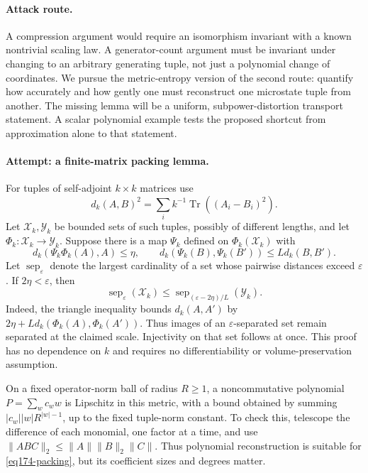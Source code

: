 \documentclass[11pt,a4paper]{article}
\newcommand{\eps}{\varepsilon}
\numberwithin{equation}{section}
\begin{document}
\paragraph{Attack route.}
A compression argument would require an isomorphism invariant with a known
nontrivial scaling law. A generator-count argument must be invariant under
changing to an arbitrary generating tuple, not just a polynomial change of
coordinates. We pursue the metric-entropy version of the second route:
quantify how accurately and how gently one must reconstruct one microstate
tuple from another. The missing lemma will be a uniform, subpower-distortion
transport statement. A scalar polynomial example tests the proposed shortcut
from approximation alone to that statement.

\paragraph{Attempt: a finite-matrix packing lemma.}
For tuples of self-adjoint $k\times k$ matrices use
\[
 d_k(A,B)^2=\sum_i k^{-1}\operatorname{Tr}((A_i-B_i)^2).
\]
Let $\mathcal X_k,\mathcal Y_k$ be bounded sets of such tuples, possibly
of different lengths, and let $\Phi_k:\mathcal X_k\to\mathcal Y_k$.
Suppose there is a map $\Psi_k$ defined on $\Phi_k(\mathcal X_k)$ with
\[
 d_k(\Psi_k\Phi_k(A),A)\le\eta,
 \qquad d_k(\Psi_k(B),\Psi_k(B'))\le Ld_k(B,B').
\]
Let $\operatorname{sep}_\eps$ denote the largest cardinality of a set whose
pairwise distances exceed $\eps$. If $2\eta<\eps$, then
\begin{equation}\label{eq174-packing}
 \operatorname{sep}_\eps(\mathcal X_k)
 \le\operatorname{sep}_{(\eps-2\eta)/L}(\mathcal Y_k).
\end{equation}
Indeed, the triangle inequality bounds
$d_k(A,A')$ by $2\eta+L d_k(\Phi_k(A),\Phi_k(A'))$.
Thus images of an $\eps$-separated set remain separated at the claimed
scale. Injectivity on that set follows at once. This proof has no dependence
on $k$ and requires no differentiability or volume-preservation assumption.

On a fixed operator-norm ball of radius $R\ge1$, a noncommutative
polynomial $P=\sum_w c_w w$ is Lipschitz in this metric, with a bound
obtained by summing $|c_w||w|R^{|w|-1}$, up to the fixed tuple-norm
constant. To check this, telescope the difference of each monomial, one
factor at a time, and use $\|ABC\|_2\le\|A\|\|B\|_2\|C\|$.
Thus polynomial reconstruction is suitable for \eqref{eq174-packing},
but its coefficient sizes and degrees matter.
\end{document}
